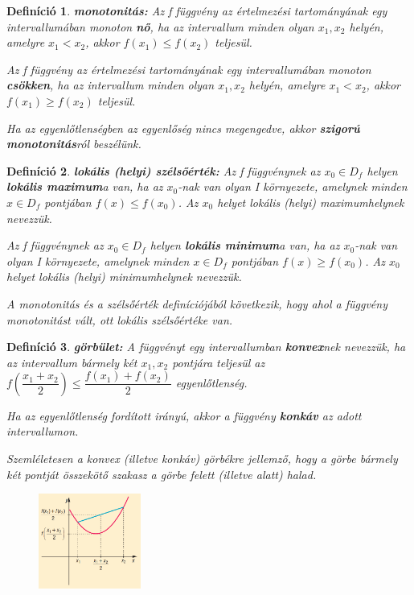 \documentclass[12pt,a4paper]{article}
\newtheorem{definition}{Definíció} [section]
\begin{document}
\begin{definition}
\textbf{monotonitás:} Az f függvény az értelmezési tartományának egy intervallumában monoton \textbf{nő}, ha az intervallum minden olyan $x_1, x_2$ helyén, amelyre $x_1 < x_2$, akkor $f(x_1) \leq f(x_2)$ teljesül.

Az f függvény az értelmezési tartományának egy intervallumában monoton \textbf{csökken}, ha az intervallum minden olyan $x_1, x_2$ helyén, amelyre $x_1 < x_2$, akkor $f(x_1) \geq f(x_2)$ teljesül.

Ha az egyenlőtlenségben az egyenlőség nincs megengedve, akkor \textbf{szigorú monotonitás}ról beszélünk.
\end{definition}

\begin{definition}
\textbf{lokális (helyi) szélsőérték:} Az f függvénynek az $x_0 \in D_f$ helyen \textbf{lokális maximum}a van, ha az $x_0$-nak van olyan I környezete, amelynek minden $x \in D_f$ pontjában $f(x) \leq f(x_0)$. Az $x_0$ helyet lokális (helyi) maximumhelynek nevezzük.

Az f függvénynek az $x_0 \in D_f$ helyen \textbf{lokális minimum}a van, ha az $x_0$-nak van olyan I környezete, amelynek minden $x \in D_f$ pontjában $f(x) \geq f(x_0)$. Az $x_0$ helyet lokális (helyi) minimumhelynek nevezzük.

A monotonitás és a szélsőérték definíciójából következik, hogy ahol a függvény monotonitást vált, ott lokális szélsőértéke van.
\end{definition}
\newpage
\begin{definition}
\textbf{görbület:} A függvényt egy intervallumban \textbf{konvex}nek nevezzük, ha az intervallum bármely két $x_1, x_2$ pontjára teljesül az $f\left(\dfrac{x_1+x_2}{2}\right) \leq \dfrac{f(x_1)+f(x_2)}{2} $ egyenlőtlenség.

Ha az egyenlőtlenség fordított irányú, akkor a függvény \textbf{konkáv} az adott intervallumon.

Szemléletesen a konvex (illetve konkáv) görbékre jellemző, hogy a görbe bármely két pontját összekötő szakasz a görbe felett (illetve alatt) halad.
\begin{figure}[h]
\centering
\includegraphics[width=0.3\textwidth]{konvexitas_def}
\end{figure}
\end{definition}
\end{document}

